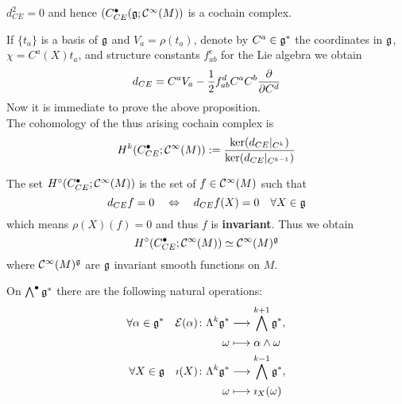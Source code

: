 \begin{prop}
  $d_{CE}^2 = 0$ and hence $(C_{CE}^\bullet(\mathfrak{g} ; \mathcal{C}^{\infty}(M))$ is a cochain complex.
\end{prop}

If $\{t_a\}$ is a basis of $\mathfrak{g}$ and $V_a = \rho(t_a)$, denote by $C^a \in \mathfrak{g}^*$ the coordinates in $\mathfrak{g}$, $\chi= C^a(X) t_a$, and structure constants $f_{ab}^c$ for the Lie algebra we obtain
$$ d_{CE} = C^a V_a - \frac{1}{2} f^d_{ab} C^a C^b \frac{\partial }{\partial C^d} $$
Now it is immediate to prove the above proposition.\\

The cohomology of the thus arising cochain complex is
$$ H^k(C_{CE}^\bullet; \mathcal{C}^{\infty}(M)) := \frac{\ker(d_{CE}|_{C^k})}{\ker(d_{CE}|_{C^{k-1}})} $$

\begin{rem}
  The set $H^\circ (C_{CE}^\bullet; \mathcal{C}^{\infty}(M))$ is the set of $f \in \mathcal{C}^{\infty}(M)$ such that
  $$ d_{CE} f = 0 \quad \Leftrightarrow \quad d_{CE} f(X) = 0 \quad \forall X\in \mathfrak{g} $$
  which means $\rho(X)(f) = 0$ and thus $f$ is \textbf{invariant}. Thus we obtain
  $$ H^\circ (C_{CE}^\bullet; \mathcal{C}^{\infty}(M)) \simeq \mathcal{C}^{\infty}(M)^{\mathfrak{g}} $$
  where $\mathcal{C}^{\infty}(M)^{\mathfrak{g}}$ are $\mathfrak{g}$ invariant smooth functions on $M$.
\end{rem}

On $\bigwedge^\bullet \mathfrak{g}^*$ there are the following natural operations:
\begin{align}
  \forall \alpha \in \mathfrak{g}^* \quad \mathcal{E}(\alpha) \colon \Lambda^k \mathfrak{g}^* &\longrightarrow \bigwedge^{k+1} \mathfrak{g}^*, \\
  \omega &\longmapsto \alpha \wedge \omega \\
  \forall X \in \mathfrak{g} \quad \imath(X) \colon \Lambda^k \mathfrak{g}^* &\longrightarrow \bigwedge^{k-1} \mathfrak{g}^*, \\
  \omega &\longmapsto \imath_X (\omega)
\end{align}

